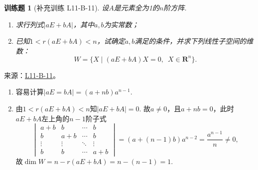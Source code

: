\documentclass[12pt,fontset=fandol]{ctexart}
\newtheorem{exercise}{训练题}[section]
\begin{document}
\begin{exercise}[补充训练 L11-B-11]\label{prob:L11-B-11}
设$A$是元素全为1的$n$阶方阵.
        \begin{enumerate}
            \item 求行列式$|aE+bA|$，其中$a,b$为实常数；

            \item 已知$1<r(aE+bA)<n$，试确定$a,b$满足的条件，并求下列线性子空间的维数：
                  \[W=\{X \mid (aE+bA)X=0,\enspace X\in\mathbf{R}^n\}.\]
        \end{enumerate}
\end{exercise}
\noindent 来源：\href{https://github.com/yhwu-is/Linear-Algebra-Left-Undone/blob/new/%E8%AE%B2%E4%B9%89/%E4%B8%93%E9%A2%98/11%20%E6%9C%9D%E8%8A%B1%E5%A4%95%E6%8B%BE.tex}{L11-B-11}。
\begin{solve}
\begin{enumerate}
                \item 容易计算$|aE=bA|=(a+nb)a^{n-1}$.

                \item 由$1<r(aE+bA)<n$知$|aE+bA|=0$. 故$a\neq 0$，且$a+nb=0$，此时$aE+bA$左上角的$n-1$阶子式
                      \[ \begin{vmatrix}
                              a+b    & b      & \cdots & b      \\
                              b      & a+b    & \cdots & b      \\
                              \vdots & \vdots & \ddots & \vdots \\
                              b      & b      & \cdots & a+b
                          \end{vmatrix}=(a+(n-1)b)a^{n-2}=\frac{a^{n-1}}{n}\neq 0, \]
                      故$\dim{W}=n-r(aE+bA)=n-(n-1)=1$.
            \end{enumerate}
\end{solve}
\end{document}
